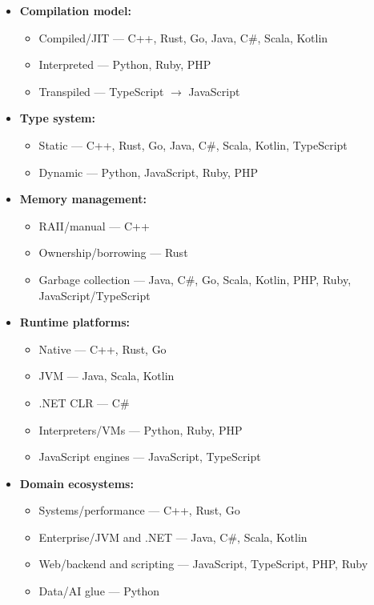 \documentclass{article} %
\begin{document}
\begin{itemize}
    \item \textbf{Compilation model:} 
    \begin{itemize}
        \item Compiled/JIT — C++, Rust, Go, Java, C\#, Scala, Kotlin
        \item Interpreted — Python, Ruby, PHP
        \item Transpiled — TypeScript $\rightarrow$ JavaScript
    \end{itemize}
    \item \textbf{Type system:}
    \begin{itemize}
        \item Static — C++, Rust, Go, Java, C\#, Scala, Kotlin, TypeScript
        \item Dynamic — Python, JavaScript, Ruby, PHP
    \end{itemize}
    \item \textbf{Memory management:}
    \begin{itemize}
        \item RAII/manual — C++
        \item Ownership/borrowing — Rust
        \item Garbage collection — Java, C\#, Go, Scala, Kotlin, PHP, Ruby, JavaScript/TypeScript
    \end{itemize}
    \item \textbf{Runtime platforms:}
    \begin{itemize}
        \item Native — C++, Rust, Go
        \item JVM — Java, Scala, Kotlin
        \item .NET CLR — C\#
        \item Interpreters/VMs — Python, Ruby, PHP
        \item JavaScript engines — JavaScript, TypeScript
    \end{itemize}
    \item \textbf{Domain ecosystems:}
    \begin{itemize}
        \item Systems/performance — C++, Rust, Go
        \item Enterprise/JVM and .NET — Java, C\#, Scala, Kotlin
        \item Web/backend and scripting — JavaScript, TypeScript, PHP, Ruby
        \item Data/AI glue — Python
    \end{itemize}
\end{itemize}
\end{document}
